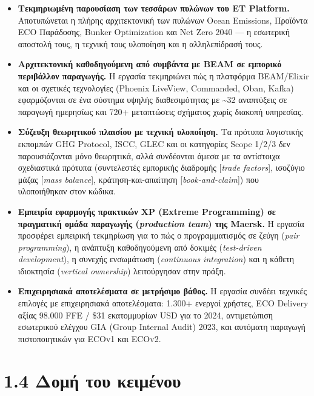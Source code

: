 \documentclass[11pt,a4paper,greek,twoside]{template-xe}
\begin{document}
\begin{itemize}
\item
  \textbf{Τεκμηριωμένη παρουσίαση των τεσσάρων πυλώνων του ET Platform.}
  Αποτυπώνεται η πλήρης αρχιτεκτονική των πυλώνων Ocean Emissions,
  Προϊόντα ECO Παράδοσης, Bunker Optimization και Net Zero 2040 --- η
  εσωτερική αποστολή τους, η τεχνική τους υλοποίηση και η αλληλεπίδρασή
  τους.
\item
  \textbf{Αρχιτεκτονική καθοδηγούμενη από συμβάντα με BEAM σε εμπορικό
  περιβάλλον παραγωγής.} Η εργασία τεκμηριώνει πώς η πλατφόρμα
  BEAM/Elixir και οι σχετικές τεχνολογίες (Phoenix LiveView, Commanded,
  Oban, Kafka) εφαρμόζονται σε ένα σύστημα υψηλής διαθεσιμότητας με
  \textasciitilde32 αναπτύξεις σε παραγωγή ημερησίως και 720+
  μεταπτώσεις σχήματος χωρίς διακοπή υπηρεσίας.
\item
  \textbf{Σύζευξη θεωρητικού πλαισίου με τεχνική υλοποίηση.} Τα πρότυπα
  λογιστικής εκπομπών GHG Protocol, ISCC, GLEC και οι κατηγορίες Scope
  1/2/3 δεν παρουσιάζονται μόνο θεωρητικά, αλλά συνδέονται άμεσα με τα
  αντίστοιχα σχεδιαστικά πρότυπα (συντελεστές εμπορικής διαδρομής
  {[}\emph{trade factors}{]}, ισοζύγιο μάζας {[}\emph{mass balance}{]},
  κράτηση-και-απαίτηση {[}\emph{book-and-claim}{]}) που υλοποιήθηκαν
  στον κώδικα.
\item
  \textbf{Εμπειρία εφαρμογής πρακτικών XP (Extreme Programming) σε
  πραγματική ομάδα παραγωγής (\emph{production team}) της Maersk.} Η
  εργασία προσφέρει εμπειρική τεκμηρίωση για το πώς ο προγραμματισμός σε
  ζεύγη (\emph{pair programming}), η ανάπτυξη καθοδηγούμενη από δοκιμές
  (\emph{test-driven development}), η συνεχής ενσωμάτωση
  (\emph{continuous integration}) και η κάθετη ιδιοκτησία
  (\emph{vertical ownership}) λειτούργησαν στην πράξη.
\item
  \textbf{Επιχειρησιακά αποτελέσματα σε μετρήσιμο βάθος.} Η εργασία
  συνδέει τεχνικές επιλογές με επιχειρησιακά αποτελέσματα: 1.300+
  ενεργοί χρήστες, ECO Delivery αξίας 98.000 FFE / \$31 εκατομμυρίων USD
  για το 2024, αντιμετώπιση εσωτερικού ελέγχου GIA (Group Internal
  Audit) 2023, και αυτόματη παραγωγή πιστοποιητικών για ECOv1 και ECOv2.
\end{itemize}

\section{1.4 Δομή του
κειμένου}\label{ux3b4ux3bfux3bcux3ae-ux3c4ux3bfux3c5-ux3baux3b5ux3b9ux3bcux3adux3bdux3bfux3c5}
\end{document}

